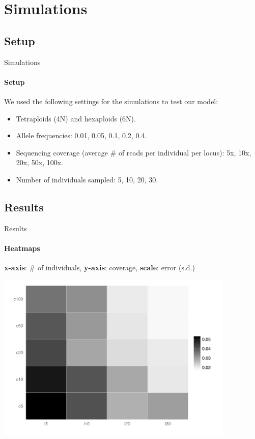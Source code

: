 \documentclass[presentation]{beamer}
\begin{document}
\section{Simulations}

\subsection{Setup}

\begin{frame}[t]{Simulations}
	\framesubtitle{Setup}
	
	We used the following settings for the simulations to test our model:
	\vspace{0.1in}
	
	\begin{itemize}
		\item Tetraploids (4N) and hexaploids (6N).
		\item Allele frequencies: 0.01, 0.05, 0.1, 0.2, 0.4.
		\item Sequencing coverage (average \# of reads per individual per locus): 5x, 10x, 20x, 50x, 100x.
		\item Number of individuals sampled: 5, 10, 20, 30.
	\end{itemize}
\end{frame}

\subsection{Results}

\begin{frame}[c]{Results}
	\framesubtitle{Heatmaps}
	\textbf{x-axis}: \# of individuals, \textbf{y-axis}: coverage, \textbf{scale}: error (s.d.)
	\pause
	\begin{center}
		\includegraphics[width=0.85\textwidth]{fig/hex-plot0-05}
	\end{center}
\end{frame}
\end{document}
